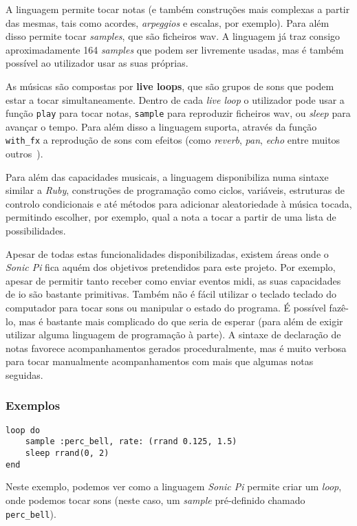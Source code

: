 A linguagem permite tocar notas (e também construções mais complexas a partir das mesmas, tais como acordes, \textit{arpeggios} e escalas, por exemplo). Para além disso permite tocar \textit{samples}, que são ficheiros \acrfull{wav}. A linguagem já traz consigo aproximadamente 164 \textit{samples} que podem ser livremente usadas, mas é também possível ao utilizador usar as suas próprias.

As músicas são compostas por \textbf{live loops}, que são grupos de sons que podem estar a tocar simultaneamente. Dentro de cada \textit{live loop} o utilizador pode usar a função \texttt{play} para tocar notas, \texttt{sample} para reproduzir ficheiros \acrshort{wav}, ou \textit{sleep} para avançar o tempo. Para além disso a linguagem suporta, através da função \texttt{with\_fx} a reprodução de sons com efeitos (como \textit{reverb}, \textit{pan}, \textit{echo} entre muitos outros~\citep{sonic-pi-fx}).

Para além das capacidades musicais, a linguagem disponibiliza numa sintaxe similar a \textit{Ruby}, construções de programação como ciclos, variáveis, estruturas de controlo condicionais e até métodos para adicionar aleatoriedade à música tocada, permitindo escolher, por exemplo, qual a nota a tocar a partir de uma lista de possibilidades.

Apesar de todas estas funcionalidades disponibilizadas, existem áreas onde o \textit{Sonic Pi} fica aquém dos objetivos pretendidos para este projeto. Por exemplo, apesar de permitir tanto receber como enviar eventos \acrshort{midi}, as suas capacidades de \acrfull{io} são bastante primitivas. Também não é fácil utilizar o teclado teclado do computador para tocar sons ou manipular o estado do programa. É possível fazê-lo, mas é bastante mais complicado do que seria de esperar (para além de exigir utilizar alguma linguagem de programação à parte). A sintaxe de declaração de notas favorece acompanhamentos gerados proceduralmente, mas é muito verbosa para tocar manualmente acompanhamentos com mais que algumas notas seguidas.

\subsubsection{Exemplos}
\begin{lstlisting}[caption={Reproduzir um \textit{sample} com valores aleatórios}] 
loop do
    sample :perc_bell, rate: (rrand 0.125, 1.5)
    sleep rrand(0, 2)
end
\end{lstlisting}
Neste exemplo, podemos ver como a linguagem \textit{Sonic Pi} permite criar um \textit{loop}, onde podemos tocar sons (neste caso, um \textit{sample} pré-definido chamado \texttt{perc\_bell}).

